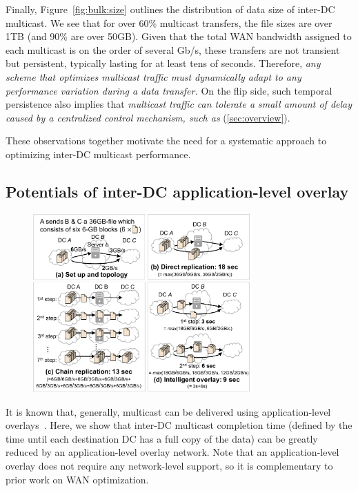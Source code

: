 Finally, Figure~\ref{fig:bulk:size} outlines the distribution of data
size of inter-DC multicast. We see that for over 60\% multicast
transfers, the file sizes are over 1TB (and 90\% are over 50GB).
Given that the total WAN bandwidth assigned to each multicast is on
the order of several Gb/s, these transfers are not transient but
persistent, typically lasting for at least tens of seconds.
Therefore, {\em any scheme that optimizes multicast traffic must
dynamically adapt to any performance variation during a data transfer.}
On the flip side, such temporal persistence also implies that {\em
multicast traffic can tolerate a small amount of delay caused by
a centralized control mechanism, such as \name}
(\Section\ref{sec:overview}).


\vspace{0.1cm}
These observations together motivate the need for a systematic approach
to optimizing inter-DC multicast performance.

\subsection{Potentials of inter-DC application-level overlay}
\label{subsec:motivation:case-for}

\begin{figure}[t]
\centering
\includegraphics[width=84mm]{images/example-2.pdf}
\vspace{-0.4cm}
\label{fig:case:example}
\vspace{-0.4cm}
\end{figure}

It is known that, generally, multicast can be delivered using application-level
overlays~\cite{chu2000case}. Here, we show that inter-DC multicast
completion time (defined by the time until each destination DC has
a full copy of the data) can be greatly reduced by an
application-level overlay network. Note that an application-level
overlay does not require any network-level support, so it is
complementary to prior work on WAN optimization.

